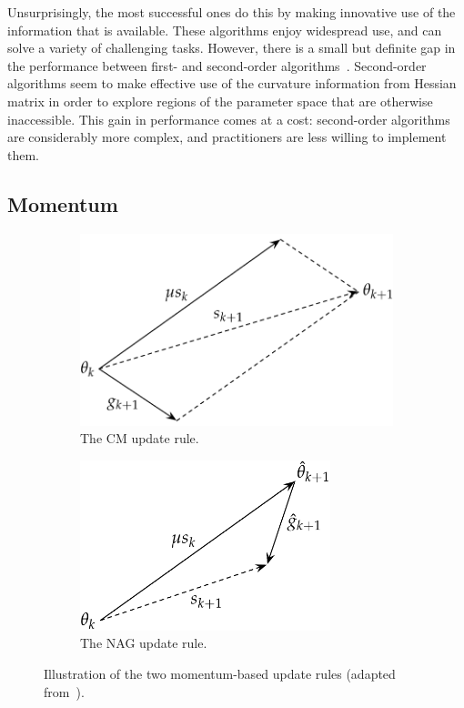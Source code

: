 \documentclass[11pt,a4paper]{article}
\numberwithin{equation}{section}
\begin{document}
Unsurprisingly, the most successful ones do this by making innovative use of the
information that is available. These algorithms enjoy widespread use, and can
solve a variety of challenging tasks. However, there is a small but definite gap
in the performance between first- and second-order
algorithms~\citep{martens2010deep, ngiam2011optimization,
sutskever2013importance}. Second-order algorithms seem to make effective use of
the curvature information from Hessian matrix in order to explore regions of the
parameter space that are otherwise inaccessible. This gain in performance comes
at a cost: second-order algorithms are considerably more complex, and
practitioners are less willing to implement them.

\subsection{Momentum}

\begin{figure}[t]
\centering
\begin{subfigure}[t]{0.4\textwidth}
	\centering
	\includegraphics[width=\textwidth]{graphics/cm_diagram.pdf}
	\caption{The CM update rule.\label{fig:cm_update}}
\end{subfigure}
\begin{subfigure}[t]{0.4\textwidth}
	\centering
	\includegraphics[width=0.8\textwidth]{graphics/nag_diagram.pdf}
	\caption{The NAG update rule.\label{fig:nag_update}}
\end{subfigure}
\caption{Illustration of the two momentum-based update rules (adapted
from~\citet{sutskever2013importance}).\label{fig:momentum_updates}}
\end{figure}
\end{document}
